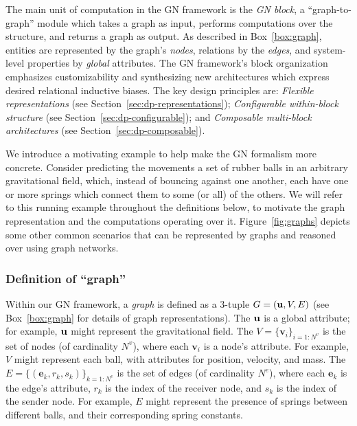 The main unit of computation in the GN framework is the \emph{GN block}, a ``graph-to-graph'' module which takes a graph as input, performs computations over the structure, and returns a graph as output. As described in Box~\ref{box:graph}, entities are represented by the graph's \emph{nodes}, relations by the \emph{edges}, and system-level properties by  \emph{global} attributes. The GN framework's block organization emphasizes customizability and synthesizing new architectures which express desired relational inductive biases. The key design principles are: 
\emph{Flexible representations} (see Section~\ref{sec:dp-representations}); \emph{Configurable within-block structure} (see Section~\ref{sec:dp-configurable}); and \emph{Composable multi-block architectures} (see Section~\ref{sec:dp-composable}).

We introduce a motivating example to help make the GN formalism more concrete.
Consider predicting the movements a set of rubber balls in an arbitrary gravitational field, which, instead of bouncing against one another, each have one or more springs which connect them to some (or all) of the others.
We will refer to this running example throughout the definitions below, to motivate the graph representation and the computations operating over it.
Figure~\ref{fig:graphs} depicts some other common scenarios that can be represented by graphs and reasoned over using graph networks.


\subsubsection{Definition of ``graph''}
Within our GN framework, a \emph{graph} is defined as a 3-tuple $G= \left(\mathbf{u}, V, E\right)$ (see Box~\ref{box:graph} for details of graph representations). The $\mathbf{u}$ is a global attribute; for example, $\mathbf{u}$ might represent the gravitational field. The $V = \{\mathbf{v}_i\}_{i=1:N^v}$ is the set of nodes (of cardinality $N^v$), where each $\mathbf{v}_i$ is a node's attribute. For example, $V$ might represent each ball, with attributes for position, velocity, and mass. The $E = \{\left(\mathbf{e}_k, r_k, s_k\right)\}_{k=1:N^e}$ is the set of edges (of cardinality $N^e$), where each $\mathbf{e}_k$ is the edge's attribute, $r_k$ is the index of the receiver node, and $s_k$ is the index of the sender node. For example, $E$ might represent the presence of springs between different balls, and their corresponding spring constants.

